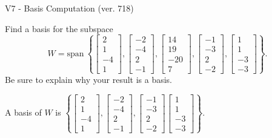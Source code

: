 \begin{exercise}
  \begin{exerciseTitle}V7 - Basis Computation (ver. 718)\end{exerciseTitle}
  \begin{exerciseStatement}
    Find a basis for the subspace 
\[W=\mathrm{span}\ \left\{\left[\begin{array}{r}
2 \\
1 \\
-4 \\
1
\end{array}\right] , \left[\begin{array}{r}
-2 \\
-4 \\
2 \\
-1
\end{array}\right] , \left[\begin{array}{r}
14 \\
19 \\
-20 \\
7
\end{array}\right] , \left[\begin{array}{r}
-1 \\
-3 \\
2 \\
-2
\end{array}\right] , \left[\begin{array}{r}
1 \\
1 \\
-3 \\
-3
\end{array}\right]\right\}.\]
 Be sure to explain why your result is a basis.


  \end{exerciseStatement}
  \begin{exerciseAnswer}
   A basis of \(W\) is  \(\left\{\left[\begin{array}{r}
2 \\
1 \\
-4 \\
1
\end{array}\right] , \left[\begin{array}{r}
-2 \\
-4 \\
2 \\
-1
\end{array}\right] , \left[\begin{array}{r}
-1 \\
-3 \\
2 \\
-2
\end{array}\right] \left[\begin{array}{r}
1 \\
1 \\
-3 \\
-3
\end{array}\right]\right\}\).
  


  \end{exerciseAnswer}
\end{exercise}